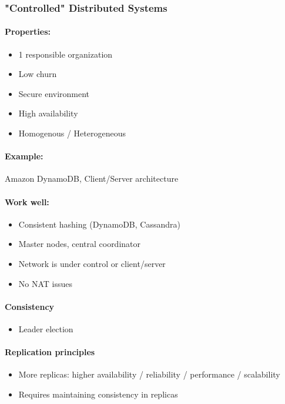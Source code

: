 \subsubsection{"Controlled" Distributed Systems}
\paragraph{Properties:}
\begin{itemize}
    \item 1 responsible organization
    \item Low churn
    \item Secure environment
    \item High availability
    \item Homogenous / Heterogeneous
\end{itemize}
\paragraph{Example:}
Amazon DynamoDB, Client/Server architecture
\paragraph{Work well:} 
\begin{itemize}
    \item Consistent hashing (DynamoDB, Cassandra)
    \item Master nodes, central coordinator
    \item Network is under control or client/server
    \item No NAT issues
\end{itemize}
\paragraph{Consistency}
\begin{itemize}
    \item Leader election
\end{itemize}
\paragraph{Replication principles}
\begin{itemize}
    \item More replicas: higher availability / reliability / performance / scalability
    \item Requires maintaining consistency in replicas
\end{itemize}

